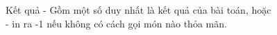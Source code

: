 Kết quả  
- Gồm một số duy nhất là kết quả của bài toán, hoặc   
\\   - in ra -1 nếu không có cách gọi món nào thỏa mãn.